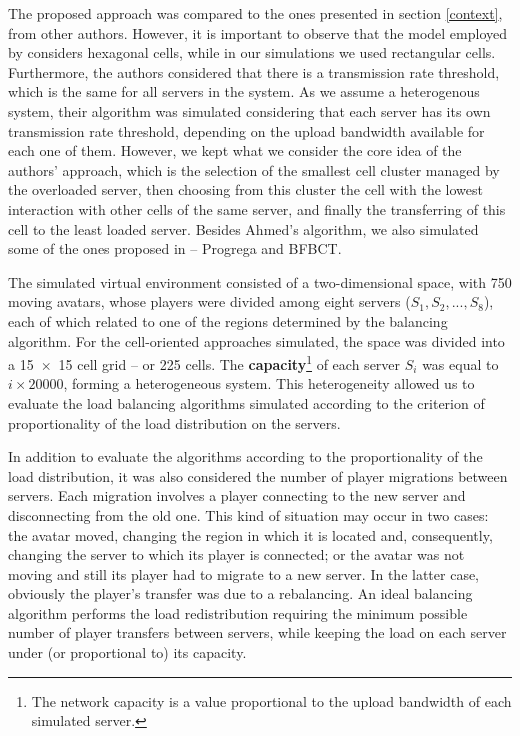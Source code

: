\documentclass[acmjacm]{acmtrans2m}
\begin{document}
The proposed approach was compared to the ones presented in section \ref{context}, from other authors. However, it is important to observe that the model employed by \cite{ahmed2008mol} considers hexagonal cells, while in our simulations we used rectangular cells. Furthermore, the authors considered that there is a transmission rate threshold, which is the same for all servers in the system. As we assume a heterogenous system, their algorithm was simulated considering that each server has its own transmission rate threshold, depending on the upload bandwidth available for each one of them. However, we kept what we consider the core idea of the authors' approach, which is the selection of the smallest cell cluster managed by the overloaded server, then choosing from this cluster the cell with the lowest interaction with other cells of the same server, and finally the transferring of this cell to the least loaded server. Besides Ahmed's algorithm, we also simulated some of the ones proposed in \cite{bezerra2009lbs} -- Progrega and BFBCT.

The simulated virtual environment consisted of a two-dimensional space, with 750 moving avatars, whose players were divided among eight servers ($S_1, S_2, ..., S_8$), each of which related to one of the regions determined by the balancing algorithm. For the cell-oriented approaches simulated, the space was divided into a \mbox{15 $\times$ 15} cell grid -- or 225 cells. The \textbf{capacity}\footnote{The network capacity is a value proportional to the upload bandwidth of each simulated server.} of each server $S_i$ was equal to $i \times 20000$, forming a heterogeneous system. This heterogeneity allowed us to evaluate the load balancing algorithms simulated according to the criterion of proportionality of the load distribution on the servers.

In addition to evaluate the algorithms according to the proportionality of the load distribution, it was also considered the number of player migrations between servers. Each migration involves a player connecting to the new server and disconnecting from the old one. This kind of situation may occur in two cases: the avatar moved, changing the region in which it is located and, consequently, changing the server to which its player is connected; or the avatar was not moving and still its player had to migrate to a new server. In the latter case, obviously the player's transfer was due to a rebalancing. An ideal balancing algorithm performs the load redistribution requiring the minimum possible number of player transfers between servers, while keeping the load on each server under (or proportional to) its capacity.
\end{document}
